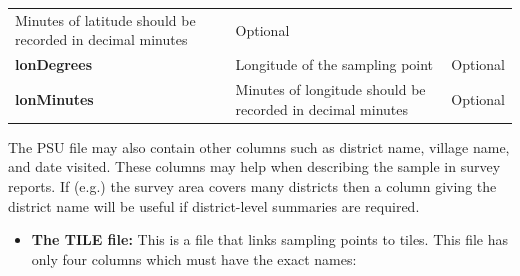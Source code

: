 \documentclass[12pt,a4paper]{book}
\providecommand{\tightlist}{%
  \setlength{\itemsep}{0pt}\setlength{\parskip}{0pt}}
\theoremstyle{definition}
\theoremstyle{definition}
\theoremstyle{definition}
\theoremstyle{remark}
\begin{document}
\begin{longtable}[]{@{}lll@{}}
\begin{minipage}[t]{0.36\columnwidth}
Minutes of latitude should be recorded in decimal minutes\strut
\end{minipage} & \begin{minipage}[t]{0.36\columnwidth}\raggedright
Optional\strut
\end{minipage}\tabularnewline
\begin{minipage}[t]{0.19\columnwidth}\raggedright
\textbf{lonDegrees}\strut
\end{minipage} & \begin{minipage}[t]{0.36\columnwidth}\raggedright
Longitude of the sampling point\strut
\end{minipage} & \begin{minipage}[t]{0.36\columnwidth}\raggedright
Optional\strut
\end{minipage}\tabularnewline
\begin{minipage}[t]{0.19\columnwidth}\raggedright
\textbf{lonMinutes}\strut
\end{minipage} & \begin{minipage}[t]{0.36\columnwidth}\raggedright
Minutes of longitude should be recorded in decimal minutes\strut
\end{minipage} & \begin{minipage}[t]{0.36\columnwidth}\raggedright
Optional\strut
\end{minipage}\tabularnewline
\bottomrule
\end{longtable}

The PSU file may also contain other columns such as district name,
village name, and date visited. These columns may help when describing
the sample in survey reports. If (e.g.) the survey area covers many
districts then a column giving the district name will be useful if
district-level summaries are required.

\begin{itemize}
\tightlist
\item
  \textbf{The TILE file:} This is a file that links sampling points to
  tiles. This file has only four columns which must have the exact
  names:
\end{itemize}
\end{document}
